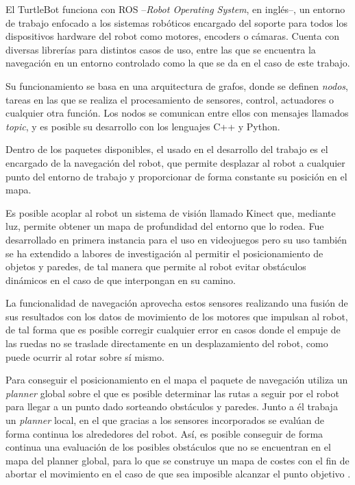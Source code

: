 El TurtleBot funciona con ROS --\textit{Robot Operating System}, en inglés--, un entorno de trabajo enfocado a los sistemas robóticos encargado del soporte para todos los dispositivos hardware del robot como motores, encoders o cámaras. 
Cuenta con diversas librerías para distintos casos de uso, entre las que se encuentra la navegación en un entorno controlado como la que se da en el caso de este trabajo.

Su funcionamiento se basa en una arquitectura de grafos, donde se definen \textit{nodos}, tareas en las que se realiza el procesamiento de sensores, control, actuadores o cualquier otra función.
Los nodos se comunican entre ellos con mensajes llamados \textit{topic}, y es posible su desarrollo con los lenguajes C++ y Python.

Dentro de los paquetes disponibles, el usado en el desarrollo del trabajo es el encargado de la navegación del robot, que permite desplazar al robot a cualquier punto del entorno de trabajo y proporcionar de forma constante su posición en el mapa.

Es posible acoplar al robot un sistema de visión llamado Kinect que, mediante luz, permite obtener un mapa de profundidad del entorno que lo rodea.
Fue desarrollado en primera instancia para el uso en videojuegos pero su uso también se ha extendido a labores de investigación al permitir el posicionamiento de objetos y paredes, de tal manera que permite al robot evitar obstáculos dinámicos en el caso de que interpongan en su camino.

La funcionalidad de navegación aprovecha estos sensores realizando una fusión de sus resultados con los datos de movimiento de los motores que impulsan al robot, de tal forma que es posible corregir cualquier error en casos donde el empuje de las ruedas no se traslade directamente en un desplazamiento del robot, como puede ocurrir al rotar sobre sí mismo.

Para conseguir el posicionamiento en el mapa el paquete de navegación utiliza un \textit{planner} global sobre el que es posible determinar las rutas a seguir por el robot para llegar a un punto dado sorteando obstáculos y paredes.
Junto a él trabaja un \textit{planner} local, en el que gracias a los sensores incorporados se evalúan de forma continua los alrededores del robot.
Así, es posible conseguir de forma continua una evaluación de los posibles obstáculos que no se encuentran en el mapa del planner global, para lo que se construye un mapa de costes con el fin de abortar el movimiento en el caso de que sea imposible alcanzar el punto objetivo \cite{ROSDoc}.

